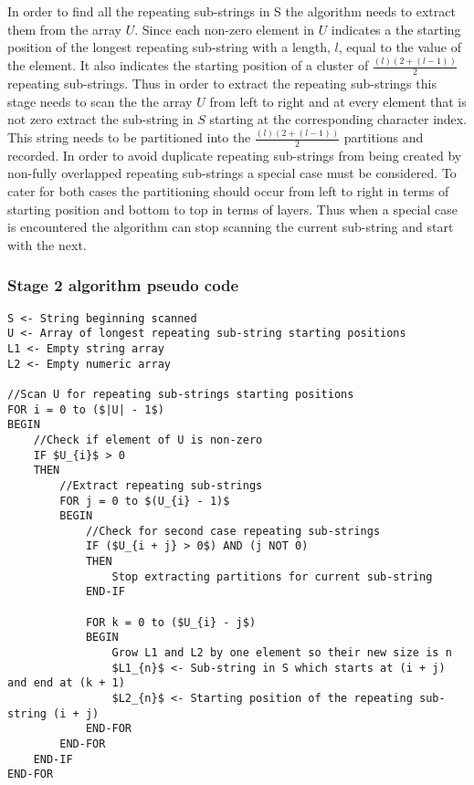 \documentclass[12pt]{article}
\begin{document}
\begin{flushleft}
	In order to find all the repeating sub-strings in S the algorithm needs to extract them from the array $U$. Since each non-zero element in $U$ indicates a the starting position of the longest repeating sub-string with a length, $l$, equal to the value of the element. It also indicates the starting position of a cluster of $\frac{(l)(2 + (l-1))}{2}$ repeating sub-strings. Thus in order to extract the repeating sub-strings this stage needs to scan the the array $U$ from left to right and at every element that is not zero extract the sub-string in $S$ starting at the corresponding character index. This string needs to be partitioned into the $\frac{(l)(2 + (l-1))}{2}$ partitions and recorded. In order to avoid duplicate repeating sub-strings from being created by non-fully overlapped repeating sub-strings a special case must be considered. To cater for both cases the partitioning should occur from left to right in terms of starting position and bottom to top in terms of layers. Thus when a special case is encountered the algorithm can stop scanning the current sub-string and start with the next.
	\newpage
	\subsubsection{Stage 2 algorithm pseudo code}

\begin{lstlisting}
S <- String beginning scanned
U <- Array of longest repeating sub-string starting positions
L1 <- Empty string array
L2 <- Empty numeric array

//Scan U for repeating sub-strings starting positions 
FOR i = 0 to ($|U| - 1$)  
BEGIN			                
	//Check if element of U is non-zero
	IF $U_{i}$ > 0 
	THEN
		//Extract repeating sub-strings
		FOR j = 0 to $(U_{i} - 1)$ 
		BEGIN                  
			//Check for second case repeating sub-strings
			IF ($U_{i + j} > 0$) AND (j NOT 0) 
			THEN
				Stop extracting partitions for current sub-string
			END-IF
			
			FOR k = 0 to ($U_{i} - j$)
			BEGIN                               
				Grow L1 and L2 by one element so their new size is n
				$L1_{n}$ <- Sub-string in S which starts at (i + j) and end at (k + 1)
				$L2_{n}$ <- Starting position of the repeating sub-string (i + j)
			END-FOR
		END-FOR
	END-IF	
END-FOR		
\end{lstlisting}
	\newpage	

\end{flushleft}
\end{document}
